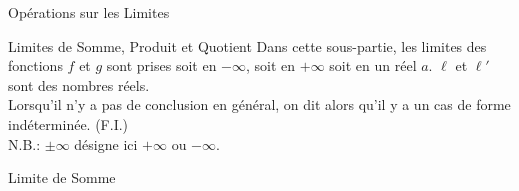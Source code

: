 \documentclass{cours}
\begin{document}
    \begin{Gpartie}{Opérations sur les Limites} 
        \begin{Spartie}{Limites de Somme, Produit et Quotient} 
            Dans cette sous-partie, les limites des fonctions $f$ et $g$ sont prises soit en $-\infty$, soit en $+\infty$ soit en un réel $a$. $\ell$ et $\ell'$ sont des nombres réels. \\ Lorsqu'il n'y a pas de conclusion en général, on dit alors qu'il y a un cas de forme indéterminée. (F.I.) \\
            N.B.: $\pm\infty$ désigne ici $+\infty$ ou $-\infty$.
            \pagebreak
            \begin{SSpartie}{Limite de Somme} 
                \begin{table}[H]
                    \centering {}
\end{table}
\end{SSpartie}
\end{Spartie}
\end{Gpartie}
\end{document}
